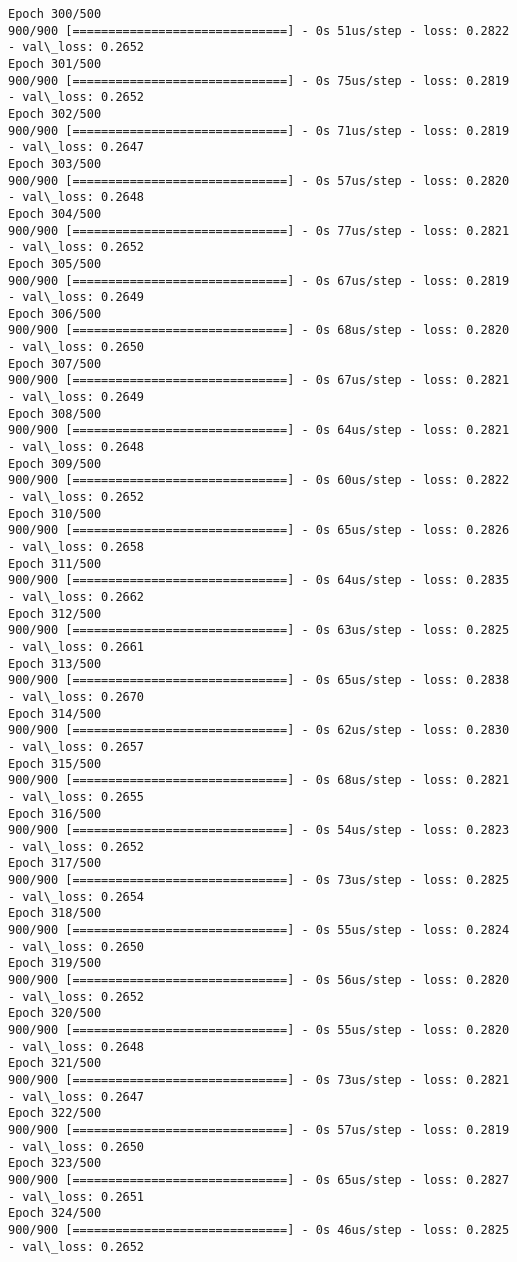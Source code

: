 \documentclass[11pt]{article}
\begin{document}
\begin{Verbatim}[commandchars=\\\{\}]
Epoch 300/500
900/900 [==============================] - 0s 51us/step - loss: 0.2822 - val\_loss: 0.2652
Epoch 301/500
900/900 [==============================] - 0s 75us/step - loss: 0.2819 - val\_loss: 0.2652
Epoch 302/500
900/900 [==============================] - 0s 71us/step - loss: 0.2819 - val\_loss: 0.2647
Epoch 303/500
900/900 [==============================] - 0s 57us/step - loss: 0.2820 - val\_loss: 0.2648
Epoch 304/500
900/900 [==============================] - 0s 77us/step - loss: 0.2821 - val\_loss: 0.2652
Epoch 305/500
900/900 [==============================] - 0s 67us/step - loss: 0.2819 - val\_loss: 0.2649
Epoch 306/500
900/900 [==============================] - 0s 68us/step - loss: 0.2820 - val\_loss: 0.2650
Epoch 307/500
900/900 [==============================] - 0s 67us/step - loss: 0.2821 - val\_loss: 0.2649
Epoch 308/500
900/900 [==============================] - 0s 64us/step - loss: 0.2821 - val\_loss: 0.2648
Epoch 309/500
900/900 [==============================] - 0s 60us/step - loss: 0.2822 - val\_loss: 0.2652
Epoch 310/500
900/900 [==============================] - 0s 65us/step - loss: 0.2826 - val\_loss: 0.2658
Epoch 311/500
900/900 [==============================] - 0s 64us/step - loss: 0.2835 - val\_loss: 0.2662
Epoch 312/500
900/900 [==============================] - 0s 63us/step - loss: 0.2825 - val\_loss: 0.2661
Epoch 313/500
900/900 [==============================] - 0s 65us/step - loss: 0.2838 - val\_loss: 0.2670
Epoch 314/500
900/900 [==============================] - 0s 62us/step - loss: 0.2830 - val\_loss: 0.2657
Epoch 315/500
900/900 [==============================] - 0s 68us/step - loss: 0.2821 - val\_loss: 0.2655
Epoch 316/500
900/900 [==============================] - 0s 54us/step - loss: 0.2823 - val\_loss: 0.2652
Epoch 317/500
900/900 [==============================] - 0s 73us/step - loss: 0.2825 - val\_loss: 0.2654
Epoch 318/500
900/900 [==============================] - 0s 55us/step - loss: 0.2824 - val\_loss: 0.2650
Epoch 319/500
900/900 [==============================] - 0s 56us/step - loss: 0.2820 - val\_loss: 0.2652
Epoch 320/500
900/900 [==============================] - 0s 55us/step - loss: 0.2820 - val\_loss: 0.2648
Epoch 321/500
900/900 [==============================] - 0s 73us/step - loss: 0.2821 - val\_loss: 0.2647
Epoch 322/500
900/900 [==============================] - 0s 57us/step - loss: 0.2819 - val\_loss: 0.2650
Epoch 323/500
900/900 [==============================] - 0s 65us/step - loss: 0.2827 - val\_loss: 0.2651
Epoch 324/500
900/900 [==============================] - 0s 46us/step - loss: 0.2825 - val\_loss: 0.2652

\end{Verbatim}
\end{document}

